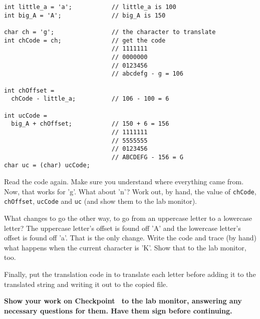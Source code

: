 \documentclass[12pt,oneside]{memoir}
\newcommand\code[1]{\lstinline^#1^}
\newenvironment{Checkpoint}[1]{%
  \begin{Exercise}[name={Checkpoint},title={#1}]}{%
  \end{Exercise}%
  \textbf{Show your work on Checkpoint~\theExercise{} to the lab monitor, %
    answering any necessary questions for them.  Have them sign before continuing.}}
\begin{document}
\begin{Checkpoint}{SwitchCase.java}
\begin{lstlisting}
int little_a = 'a';           // little_a is 100
int big_A = 'A';              // big_A is 150

char ch = 'g';                // the character to translate
int chCode = ch;              // get the code
                              // 1111111
                              // 0000000
                              // 0123456
                              // abcdefg - g = 106

int chOffset = 
  chCode - little_a;          // 106 - 100 = 6

int ucCode = 
  big_A + chOffset;           // 150 + 6 = 156
                              // 1111111
                              // 5555555
                              // 0123456
                              // ABCDEFG - 156 = G
char uc = (char) ucCode;
\end{lstlisting}

Read the code again. Make sure you understand where everything came
from. Now, that works for 'g'. What about 'n'? Work out, by hand, the
value of \code{chCode}, \code{chOffset}, \code{ucCode} and \code{uc}
(and show them to the lab monitor).

What changes to go the other way, to go from an uppercase letter to a
lowercase letter? The uppercase letter's offset is found off 'A'
and the lowercase letter's offset is found off 'a'. That is the only
change. Write the code and trace (by hand) what happens when the
current character is 'K'. Show that to the lab monitor, too.

Finally, put the translation code in to translate each letter before
adding it to the translated string and writing it out to the copied
file.
\end{Checkpoint}
\end{document}
